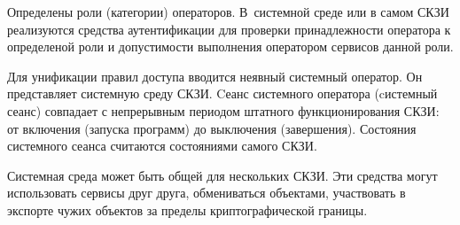 
Определены роли (категории) операторов.
%
В~системной среде или в самом СКЗИ реализуются средства аутентификации для
проверки принадлежности оператора к определеной роли и допустимости выполнения
оператором сервисов данной роли.


Для унификации правил доступа вводится неявный системный оператор.
Он представляет системную среду СКЗИ. Cеанс системного оператора 
(cистемный сеанс) совпадает с непрерывным периодом штатного функционирования 
СКЗИ: от включения (запуска программ) до выключения (завершения).
%
Состояния системного сеанса считаются состояниями самого СКЗИ.


Системная среда может быть общей для нескольких СКЗИ. Эти средства могут 
использовать сервисы друг друга, обмениваться объектами, участвовать в экспорте 
чужих объектов за пределы криптографической границы.

